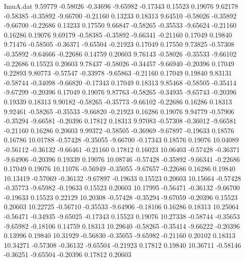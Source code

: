 \begin{filecontents}{ImuA.dat}
   9.59779   -0.58026   -0.34696   -9.65982   -0.17343    0.15523    0.19076
   9.62178   -0.58385   -0.35892   -9.66700   -0.21160    0.13233    0.18313
   9.64510   -0.58026   -0.35892   -9.66700   -0.22686    0.13233    0.17550
   9.66847   -0.58265   -0.35533   -9.65624   -0.21160    0.16286    0.19076
   9.69179   -0.58385   -0.35892   -9.66341   -0.21160    0.17049    0.19840
   9.71476   -0.58505   -0.36371   -9.65504   -0.21923    0.17049    0.17550
   9.73825   -0.57308   -0.35892   -9.64666   -0.22686    0.14759    0.20603
   9.76143   -0.58026   -0.35533   -9.66102   -0.22686    0.15523    0.20603
   9.78437   -0.58026   -0.34457   -9.66940   -0.20396    0.17049    0.22893
   9.80773   -0.57547   -0.33978   -9.65863   -0.21160    0.17049    0.19840
   9.83131   -0.58744   -0.34098   -9.66820   -0.17343    0.17049    0.18313
   9.85468   -0.58505   -0.35414   -9.67299   -0.20396    0.17049    0.19076
   9.87763   -0.58265   -0.34935   -9.65743   -0.20396    0.19339    0.18313
   9.90182   -0.58265   -0.35773   -9.66102   -0.22686    0.16286    0.18313
   9.92461   -0.58265   -0.35533   -9.66820   -0.21923    0.16286    0.19076
   9.94779   -0.57906   -0.35294   -9.66581   -0.20396    0.17812    0.18313
   9.97083   -0.57308   -0.36012   -9.66581   -0.21160    0.16286    0.20603
   9.99372   -0.58505   -0.36969   -9.67897   -0.19633    0.18576    0.16786
  10.01788   -0.57428   -0.35055   -9.66700   -0.17343    0.18576    0.19076
  10.04089   -0.56112   -0.36132   -9.66461   -0.21160    0.17812    0.16023
  10.06403   -0.57428   -0.36371   -9.64906   -0.20396    0.19339    0.19076
  10.08746   -0.57428   -0.35892   -9.66341   -0.22686    0.17049    0.19076
  10.11076   -0.56949   -0.35055   -9.67657   -0.22686    0.16286    0.19840
  10.13419   -0.57069   -0.36132   -9.67897   -0.19633    0.15523    0.20603
  10.15664   -0.57428   -0.35773   -9.65982   -0.19633    0.15523    0.20603
  10.17995   -0.56471   -0.36132   -9.66700   -0.19633    0.15523    0.22129
  10.20308   -0.57428   -0.35294   -9.67059   -0.20396    0.15523    0.20603
  10.22725   -0.56710   -0.35533   -9.64906   -0.18106    0.16286    0.18313
  10.25064   -0.56471   -0.34935   -9.65025   -0.17343    0.15523    0.19076
  10.27338   -0.58744   -0.35653   -9.65982   -0.18106    0.14759    0.18313
  10.29640   -0.58265   -0.35414   -9.66222   -0.20396    0.13996    0.19840
  10.31929   -0.56830   -0.35055   -9.65982   -0.21160    0.20102    0.18313
  10.34271   -0.57308   -0.36132   -9.65504   -0.21923    0.17812    0.19840
  10.36711   -0.58146   -0.36251   -9.65504   -0.20396    0.17812    0.20603

\end{filecontents}
